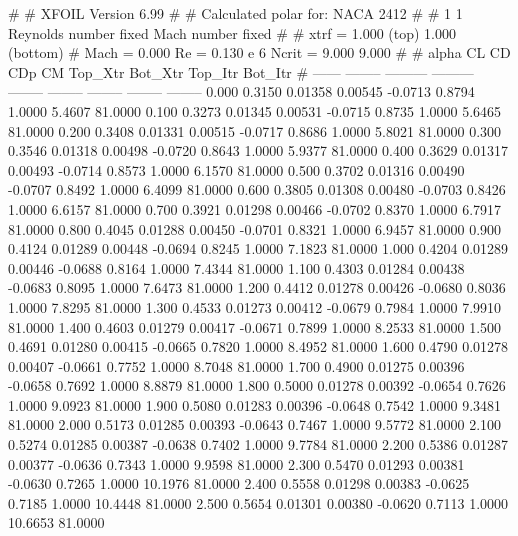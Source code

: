 #  
#       XFOIL         Version 6.99
#  
# Calculated polar for: NACA 2412                                       
#  
# 1 1 Reynolds number fixed          Mach number fixed         
#  
# xtrf =   1.000 (top)        1.000 (bottom)  
# Mach =   0.000     Re =     0.130 e 6     Ncrit =   9.000  9.000
#  
#   alpha    CL        CD       CDp       CM     Top_Xtr  Bot_Xtr  Top_Itr  Bot_Itr
#  ------ -------- --------- --------- -------- -------- -------- -------- --------
   0.000   0.3150   0.01358   0.00545  -0.0713   0.8794   1.0000   5.4607  81.0000
   0.100   0.3273   0.01345   0.00531  -0.0715   0.8735   1.0000   5.6465  81.0000
   0.200   0.3408   0.01331   0.00515  -0.0717   0.8686   1.0000   5.8021  81.0000
   0.300   0.3546   0.01318   0.00498  -0.0720   0.8643   1.0000   5.9377  81.0000
   0.400   0.3629   0.01317   0.00493  -0.0714   0.8573   1.0000   6.1570  81.0000
   0.500   0.3702   0.01316   0.00490  -0.0707   0.8492   1.0000   6.4099  81.0000
   0.600   0.3805   0.01308   0.00480  -0.0703   0.8426   1.0000   6.6157  81.0000
   0.700   0.3921   0.01298   0.00466  -0.0702   0.8370   1.0000   6.7917  81.0000
   0.800   0.4045   0.01288   0.00450  -0.0701   0.8321   1.0000   6.9457  81.0000
   0.900   0.4124   0.01289   0.00448  -0.0694   0.8245   1.0000   7.1823  81.0000
   1.000   0.4204   0.01289   0.00446  -0.0688   0.8164   1.0000   7.4344  81.0000
   1.100   0.4303   0.01284   0.00438  -0.0683   0.8095   1.0000   7.6473  81.0000
   1.200   0.4412   0.01278   0.00426  -0.0680   0.8036   1.0000   7.8295  81.0000
   1.300   0.4533   0.01273   0.00412  -0.0679   0.7984   1.0000   7.9910  81.0000
   1.400   0.4603   0.01279   0.00417  -0.0671   0.7899   1.0000   8.2533  81.0000
   1.500   0.4691   0.01280   0.00415  -0.0665   0.7820   1.0000   8.4952  81.0000
   1.600   0.4790   0.01278   0.00407  -0.0661   0.7752   1.0000   8.7048  81.0000
   1.700   0.4900   0.01275   0.00396  -0.0658   0.7692   1.0000   8.8879  81.0000
   1.800   0.5000   0.01278   0.00392  -0.0654   0.7626   1.0000   9.0923  81.0000
   1.900   0.5080   0.01283   0.00396  -0.0648   0.7542   1.0000   9.3481  81.0000
   2.000   0.5173   0.01285   0.00393  -0.0643   0.7467   1.0000   9.5772  81.0000
   2.100   0.5274   0.01285   0.00387  -0.0638   0.7402   1.0000   9.7784  81.0000
   2.200   0.5386   0.01287   0.00377  -0.0636   0.7343   1.0000   9.9598  81.0000
   2.300   0.5470   0.01293   0.00381  -0.0630   0.7265   1.0000  10.1976  81.0000
   2.400   0.5558   0.01298   0.00383  -0.0625   0.7185   1.0000  10.4448  81.0000
   2.500   0.5654   0.01301   0.00380  -0.0620   0.7113   1.0000  10.6653  81.0000
